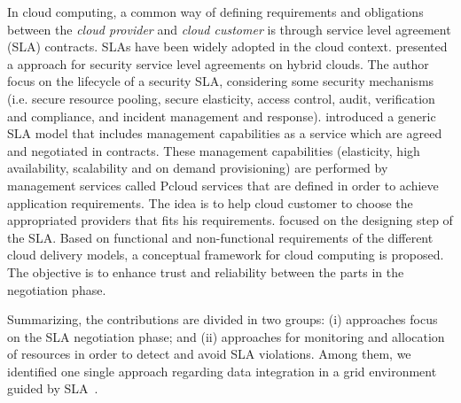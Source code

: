 \documentclass[12pt,a4paper,oneside]{report}
\begin{document}


\bigskip
In cloud computing, a common way of defining requirements and obligations between the \textit{cloud provider} and \textit{cloud customer} is through service level agreement (SLA) contracts. 
SLAs have been widely adopted in the cloud context. 
\cite{011} presented a approach for security service level agreements on hybrid clouds. The author focus on the lifecycle of a security SLA, considering some security mechanisms (i.e. secure resource pooling, secure elasticity, access control, audit, verification and compliance, and incident management and response).
\cite{009} introduced a generic SLA model that includes management capabilities as a service which are agreed and negotiated in contracts. These management capabilities (elasticity, high availability, scalability and on demand provisioning) are performed by management services called Pcloud services that are defined in order to achieve application requirements. The idea is to help cloud customer to choose the appropriated providers that fits his requirements. 
\cite{005} focused on the designing step of the SLA. 
Based on functional and non-functional requirements of the different cloud delivery models, a conceptual framework for cloud computing is proposed. 
The objective is to enhance trust and reliability between the parts in the negotiation phase.

Summarizing, the contributions are divided in two groups: (i) approaches focus on the SLA negotiation phase; and (ii) approaches for monitoring and allocation of resources in order to detect and avoid SLA violations. Among them, we identified one single approach regarding data integration in a grid environment guided by SLA~\cite{Nie07}.
\end{document}
